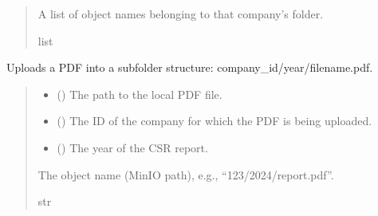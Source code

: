 \documentclass[letterpaper,10pt,english]{sphinxmanual}
\begin{document}
\begin{fulllineitems}
\begin{fulllineitems}
\begin{quote}
\begin{description}
\sphinxAtStartPar
A list of object names belonging to that company’s folder.

\sphinxAtStartPar
list

\end{description}\end{quote}

\end{fulllineitems}


\begin{fulllineitems}
\label{\detokenize{src:src.db_utils.minio.MinioFileSystem.upload_pdf}}
\pysigstartsignatures
{}
\pysigstopsignatures
\sphinxAtStartPar
Uploads a PDF into a subfolder structure: company\_id/year/filename.pdf.
\begin{quote}\begin{description}
\begin{itemize}
\item {} 
\sphinxAtStartPar
{} () \textendash{} The path to the local PDF file.

\item {} 
\sphinxAtStartPar
{} () \textendash{} The ID of the company for which the PDF is being uploaded.

\item {} 
\sphinxAtStartPar
{} () \textendash{} The year of the CSR report.

\end{itemize}

\sphinxAtStartPar
The object name (MinIO path), e.g., “123/2024/report.pdf”.

\sphinxAtStartPar
str


\end{description}
\end{quote}
\end{fulllineitems}
\end{fulllineitems}
\end{document}
